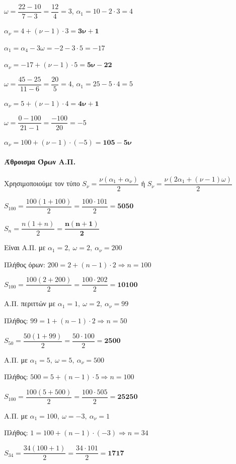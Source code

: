 \documentclass[11pt,a4paper,modern]{FFExercises}
\begin{document}
\lysh[16]
\begin{alist}
\item $\omega=\dfrac{22-10}{7-3}=\dfrac{12}{4}=3$, \quad $\alpha_1=10-2\cdot 3=4$

$\alpha_{\nu}=4+(\nu-1)\cdot 3=\boldsymbol{3\nu+1}$

\item $\alpha_1=\alpha_4-3\omega=-2-3\cdot 5=-17$

$\alpha_{\nu}=-17+(\nu-1)\cdot 5=\boldsymbol{5\nu-22}$

\item $\omega=\dfrac{45-25}{11-6}=\dfrac{20}{5}=4$, \quad $\alpha_1=25-5\cdot 4=5$

$\alpha_{\nu}=5+(\nu-1)\cdot 4=\boldsymbol{4\nu+1}$

\item $\omega=\dfrac{0-100}{21-1}=\dfrac{-100}{20}=-5$

$\alpha_{\nu}=100+(\nu-1)\cdot(-5)=\boldsymbol{105-5\nu}$
\end{alist}

\paragraph{Άθροισμα Όρων Α.Π.}

\lysh[17]
Χρησιμοποιούμε τον τύπο $S_{\nu}=\dfrac{\nu(\alpha_1+\alpha_{\nu})}{2}$ ή $S_{\nu}=\dfrac{\nu(2\alpha_1+(\nu-1)\omega)}{2}$
\begin{alist}
\item $S_{100}=\dfrac{100(1+100)}{2}=\dfrac{100\cdot 101}{2}=\boldsymbol{5050}$

\item $S_n=\dfrac{n(1+n)}{2}=\boldsymbol{\dfrac{n(n+1)}{2}}$

\item Είναι Α.Π. με $\alpha_1=2,\ \omega=2,\ \alpha_{\nu}=200$

Πλήθος όρων: $200=2+(n-1)\cdot 2 \Rightarrow n=100$

$S_{100}=\dfrac{100(2+200)}{2}=\dfrac{100\cdot 202}{2}=\boldsymbol{10100}$

\item Α.Π. περιττών με $\alpha_1=1,\ \omega=2,\ \alpha_{\nu}=99$

Πλήθος: $99=1+(n-1)\cdot 2 \Rightarrow n=50$

$S_{50}=\dfrac{50(1+99)}{2}=\dfrac{50\cdot 100}{2}=\boldsymbol{2500}$

\item Α.Π. με $\alpha_1=5,\ \omega=5,\ \alpha_{\nu}=500$

Πλήθος: $500=5+(n-1)\cdot 5 \Rightarrow n=100$

$S_{100}=\dfrac{100(5+500)}{2}=\dfrac{100\cdot 505}{2}=\boldsymbol{25250}$

\item Α.Π. με $\alpha_1=100,\ \omega=-3,\ \alpha_{\nu}=1$

Πλήθος: $1=100+(n-1)\cdot(-3) \Rightarrow n=34$

$S_{34}=\dfrac{34(100+1)}{2}=\dfrac{34\cdot 101}{2}=\boldsymbol{1717}$
\end{alist}
\end{document}
